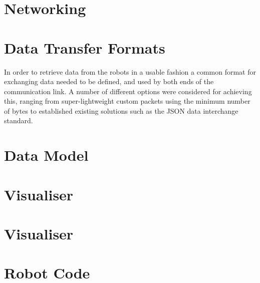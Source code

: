 
\section{Networking}



\section{Data Transfer Formats}
In order to retrieve data from the robots in a usable fashion a common format for exchanging data needed to be defined, and used by both ends of the communication link. A number of different options were considered for achieving this, ranging from super-lightweight custom packets using the minimum number of bytes to established existing solutions such as the JSON data interchange standard.


\section{Data Model}



\section{Visualiser}



\section{Visualiser}



\section{Robot Code}


